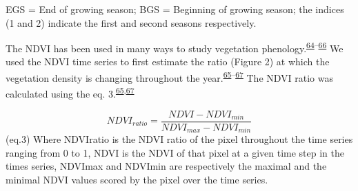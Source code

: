 \documentclass[12pt,oneside]{article}
\begin{document}
EGS = End of growing season; BGS = Beginning of growing season; the indices (1 and 2) indicate the first and second seasons respectively.

The NDVI has been used in many ways to study vegetation phenology.\textsuperscript{\protect\hyperlink{ref-DeLeeuw_et_al_2012}{64}--\protect\hyperlink{ref-Yu_et_al_2012}{66}} We used the NDVI time series to first estimate the ratio (Figure 2) at which the vegetation density is changing throughout the year.\textsuperscript{\protect\hyperlink{ref-Yu_et_al_2010}{65}--\protect\hyperlink{ref-White_et_al_1997}{67}} The NDVI ratio was calculated using the eq. 3.\textsuperscript{\protect\hyperlink{ref-Yu_et_al_2010}{65},\protect\hyperlink{ref-White_et_al_1997}{67}}

\[NDVI_{ratio} =   \frac{NDVI-NDVI_{min}}{NDVI_{max} - NDVI_{min}}\] (eq.3)
Where NDVIratio is the NDVI ratio of the pixel throughout the time series ranging from 0 to 1, NDVI is the NDVI of that pixel at a given time step in the times series, NDVImax and NDVImin are respectively the maximal and the minimal NDVI values scored by the pixel over the time series.
\end{document}
